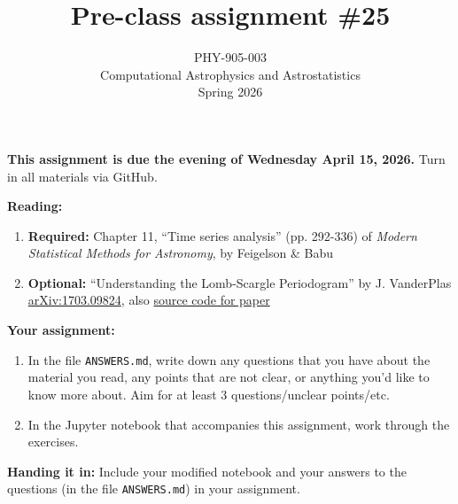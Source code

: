 \documentclass[10pt]{article}
\title{Pre-class assignment \#25}
\author{PHY-905-003\\Computational Astrophysics and
  Astrostatistics\\Spring 2026}
\date{} %
\begin{document}
 
\maketitle

\vspace{-10mm}

\noindent
\textbf{This assignment is due the evening of Wednesday April 15, 2026.}
 Turn in all materials via GitHub.

\vspace{5mm}

\noindent
\textbf{Reading:}

\begin{enumerate}

\item \textbf{Required:} Chapter 11, ``Time series analysis'' (pp. 292-336) of \textit{Modern Statistical
    Methods for Astronomy},
  by Feigelson \& Babu 

\item \textbf{Optional:} ``Understanding the
    Lomb-Scargle Periodogram'' by J. VanderPlas
    \href{https://arxiv.org/abs/1703.09824}{arXiv:1703.09824}, also
    \href{https://github.com/jakevdp/PracticalLombScargle/}{source code for paper}

\end{enumerate}

\noindent
\textbf{Your assignment:}

\begin{enumerate}

\item In the file \texttt{ANSWERS.md}, write down any questions that
you have about the material you read, any points that are not clear, or anything you'd
like to know more about.  Aim for at
least 3 questions/unclear points/etc. 

\item In the Jupyter notebook that accompanies this assignment, work
  through the exercises.

\end{enumerate}

\noindent \textbf{Handing it in:} Include your modified notebook and
your answers to the questions (in the file \texttt{ANSWERS.md})
in your assignment.
\end{document}
